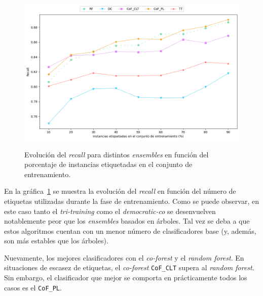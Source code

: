 \begin{figure}[h]
	\caption[\textit{Phishing}: comparativa SL contra SSL (\textit{recall})]{Evolución del \textit{recall} para distintos \textit{ensembles} en función del porcentaje de instancias etiquetadas en el conjunto de entrenamiento.}
	\centering
	\includegraphics[scale=0.45]{../img/memoria/5_phishing/f1f19_evolution_rec}
	\label{gr:ph-f1f19_sl-ssl-rec}
\end{figure}

En la gráfica~\ref{gr:ph-f1f19_sl-ssl-rec} se muestra la evolución del \textit{recall} en función del número de etiquetas utilizadas durante la fase de entrenamiento. Como se puede observar, en este caso tanto el \textit{tri-training} como el \textit{democratic-co} se desenvuelven notablemente peor que los \textit{ensembles} basados en árboles. Tal vez se deba a que estos algoritmos cuentan con un menor número de clasificadores base (y, además, son más estables que los árboles).

Nuevamente, los mejores clasificadores con el \textit{co-forest} y el \textit{random forest}. En situaciones de escasez de etiquetas, el \textit{co-forest} \texttt{CoF\_CLT} supera al \textit{random forest}. Sin embargo, el clasificador que mejor se comporta en prácticamente todos los casos es el \texttt{CoF\_PL}.


